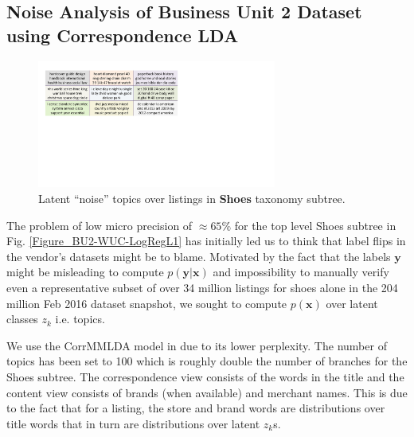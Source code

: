 \subsection{Noise Analysis of Business Unit 2 Dataset using Correspondence LDA}
\label{Subsect:BU2-noise-analysis}

 
\begin{figure}
	\vspace{-0.4cm}
	\centering
	\includegraphics[width=0.7\textwidth]{images/BU2-noise-topics}
	\vspace{-0.4cm}
	\caption{{Latent ``noise'' topics over listings in \textbf{Shoes} taxonomy subtree.}}
	\label{Figure_BU2-noise-topics}
	\vspace{-0.3cm}
\end{figure}
The problem of low micro precision of $\approx65\%$ for the top level Shoes subtree in Fig. \ref{Figure_BU2-WUC-LogRegL1} has initially led us to think that label flips in the vendor's datasets might be to blame.
Motivated by the fact that the labels $\bm{y}$ might be misleading to compute $p(\bm{y}|\bm{x})$ and impossibility to manually verify even a representative subset of over 34 million listings for shoes alone in the 204 million Feb 2016 dataset snapshot, we sought to compute $p(\bm{x})$ over latent classes $z_k$ i.e. topics.

We use the CorrMMLDA model in \cite{Das11} due to its lower perplexity.
The number of topics has been set to 100 which is roughly double the number of branches for the Shoes subtree.	
The correspondence view consists of the words in the title and the content view consists of brands (when available) and merchant names. 
This is due to the fact that for a listing, the store and brand words are distributions over title words that in turn are distributions over latent $z_k$s.
 
